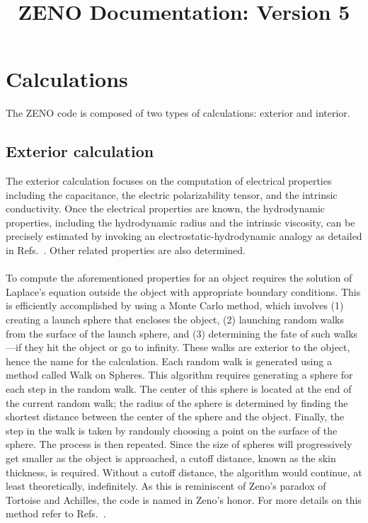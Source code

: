 \documentclass[12pt,letterpaper]{article}
\title{ZENO Documentation: Version 5 \vspace{-16pt}}
\begin{document}
\maketitle
{}

\section{Calculations}
The ZENO code is composed of two types of calculations: exterior and interior.

\subsection{Exterior calculation}
The exterior calculation focuses on the computation of electrical properties including the capacitance, the electric polarizability tensor, and the intrinsic conductivity. Once the electrical properties are known, the hydrodynamic properties, including the hydrodynamic radius and the intrinsic viscosity, can be precisely estimated by invoking an electrostatic-hydrodynamic analogy as detailed in Refs.~\cite{Douglas1995,Douglas1994,Hubbard1993}. Other related properties are also determined. \\ \\
To compute the aforementioned properties for an object requires the solution of Laplace's equation outside the object with appropriate boundary conditions. This is efficiently accomplished by using a Monte Carlo method, which involves (1) creating a launch sphere that encloses the object, (2) launching random walks from the surface of the launch sphere, and (3) determining the fate of such walks---if they hit the object or go to infinity. These walks are exterior to the object, hence the name for the calculation. Each random walk is generated using a method called Walk on Spheres. This algorithm requires generating a sphere for each step in the random walk. The center of this sphere is located at the end of the current random walk; the radius of the sphere is determined by finding the shortest distance between the center of the sphere and the object. Finally, the step in the walk is taken by randomly choosing a point on the surface of the sphere. The process is then repeated. Since the size of spheres will progressively get smaller as the object is approached, a cutoff distance, known as the skin thickness, is required. Without a cutoff distance, the algorithm would continue, at least theoretically, indefinitely. As this is reminiscent of Zeno's paradox of Tortoise and Achilles, the code is named in Zeno's honor. For more details on this method refer to Refs.~\cite{Douglas1995,Mansfield2008,Mansfield2001}.
\end{document}
